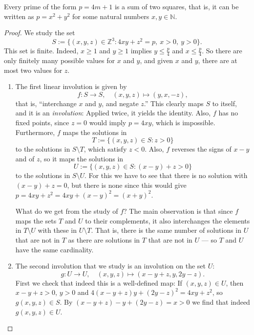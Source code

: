 \begin{proposition}
  \label{ch04.proposition2}
  Every prime of the form \(p = 4m + 1\) is a sum of two squares,
  that is, it can be written as \(p = x^2 + y^2\) for some natural numbers \(x,y \in \mathbb{N}\).
\end{proposition}
\begin{proof}
  \leanok
 We study the set
\[
S := \{(x, y, z) \in \mathbb{Z}^3 : 4xy + z^2 = p, \ x > 0, \ y > 0\}.
\]
This set is finite. Indeed, $x \geq 1$ and $y \geq 1$ implies $y \leq \frac{p}{4}$ and
$x \leq \frac{p}{4}$. So there are only finitely many possible values for $x$ and $y$, and given
$x$ and $y$, there are at most two values for $z$.

\begin{enumerate}
    \item The first linear involution is given by
    \[
    f : S \to S, \quad (x, y, z) \mapsto (y, x, -z),
    \]
    that is, ``interchange $x$ and $y$, and negate $z$.'' This clearly maps $S$ to itself, and it is
    an \emph{involution}: Applied twice, it yields the identity. Also, $f$ has no fixed points,
    since $z = 0$ would imply $p = 4xy$, which is impossible. Furthermore, $f$ maps the solutions in
    \[
    T := \{(x, y, z) \in S : z > 0\}
    \]
    to the solutions in $S \setminus T$, which satisfy $z < 0$. Also, $f$ reverses the signs of
    $x - y$ and of $z$, so it maps the solutions in
    \[
    U := \{(x, y, z) \in S : (x - y) + z > 0\}
    \]
    to the solutions in $S \setminus U$. For this we have to see that there is no solution with
    $(x - y) + z = 0$, but there is none since this would give
    $p = 4xy + z^2 = 4xy + (x - y)^2 = (x + y)^2$.

    What do we get from the study of $f$? The main observation is that since $f$ maps the sets $T$
    and $U$ to their complements, it also interchanges the elements in $T \setminus U$ with these in
    $U \setminus T$. That is, there is the same number of solutions in $U$ that are not in $T$ as
    there are solutions in $T$ that are not in $U$ — so $T$ and $U$ have the same cardinality.

    \item The second involution that we study is an involution on the set $U$:
    \[
    g : U \to U, \quad (x, y, z) \mapsto (x - y + z, y, 2y - z).
    \]
    First we check that indeed this is a well-defined map: If $(x, y, z) \in U$, then
    $x - y + z > 0$, $y > 0$ and $4(x - y + z)y + (2y - z)^2 = 4xy + z^2$, so $g(x, y, z) \in S$.
    By $(x - y + z) - y + (2y - z) = x > 0$ we find that indeed $g(x, y, z) \in U$.


\end{enumerate}
\end{proof}
